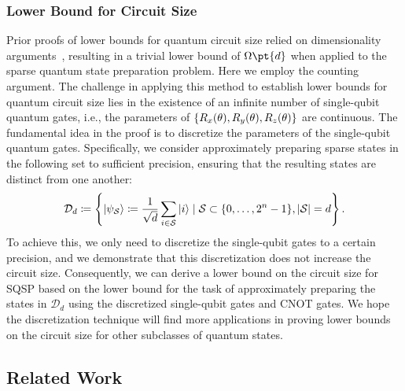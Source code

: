 \documentclass[a4paper,UKenglish,cleveref, autoref, thm-restate]{lipics-v2021}
\DeclarePairedDelimiter\cbra{\{}{\}}
\DeclarePairedDelimiter\abs{\lvert}{\rvert}
\newcommand{\om}{\Omega\pt}
\begin{document}
\subsubsection{Lower Bound for Circuit Size}

Prior proofs of lower bounds for quantum circuit size relied on dimensionality arguments~\cite{shende2004smaller, plesch2011quantum}, resulting in a trivial lower bound of $\om{d}$  when applied to the sparse quantum state preparation problem. Here we employ the counting argument. The challenge in applying this method to establish lower bounds for quantum circuit size lies in the existence of an infinite number of single-qubit quantum gates, i.e., the parameters of $\cbra{R_x(\theta), R_y(\theta), R_z(\theta)}$ are continuous. The fundamental idea in the proof is to discretize the parameters of the single-qubit quantum gates. Specifically, we consider approximately preparing  sparse states in the following set to sufficient precision, ensuring that the resulting states are distinct from one another:
\begin{align}
    \mathcal{D}_d \coloneqq \left\{ \ket{\psi_\mathcal{S}} \coloneqq \frac{1}{\sqrt{d}} \sum_{i \in \mathcal{S}} \ket{i} \mid \mathcal{S} \subset \{0, \dots, 2^n-1\}, \abs{\mathcal{S}} = d \right\}.
\end{align}
To achieve this, we only need to discretize the single-qubit gates to a certain precision, and we demonstrate that this discretization does not increase the circuit size. Consequently, we can derive a lower bound on the circuit size for SQSP based on the lower bound for the task of approximately preparing the states in $\mathcal{D}_d$ using the discretized single-qubit gates and CNOT gates. We hope the discretization technique will find more applications in proving lower bounds on the circuit size for other subclasses of quantum states.







\subsection{Related Work}
\end{document}
